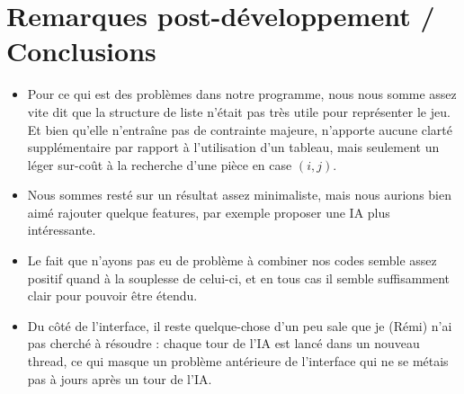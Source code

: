 \documentclass{article}
\begin{document}
\section{Remarques post-développement / Conclusions}
\begin{itemize}
    \item Pour ce qui est des problèmes dans notre programme, nous nous somme assez vite dit que la structure de liste n'était pas très utile pour représenter le jeu. Et bien qu'elle n'entraîne pas de contrainte majeure, n'apporte aucune clarté supplémentaire par rapport à l'utilisation d'un tableau, mais seulement un léger sur-coût à la recherche d'une pièce en case $(i,j)$.
    \item Nous sommes resté sur un résultat assez minimaliste, mais nous aurions bien aimé rajouter quelque features, par exemple proposer une IA plus intéressante.
    \item Le fait que n'ayons pas eu de problème à combiner nos codes semble assez positif quand à la souplesse de celui-ci, et en tous cas il semble suffisamment clair pour pouvoir être étendu.
    \item Du côté de l'interface, il reste quelque-chose d'un peu sale que je (Rémi) n'ai pas cherché à résoudre : chaque tour de l'IA est lancé dans un nouveau thread, ce qui masque un problème antérieure de l'interface qui ne se métais pas à jours après un tour de l'IA.
\end{itemize}
\end{document}
